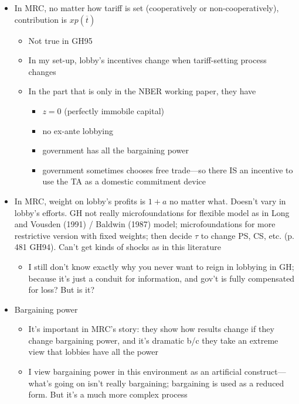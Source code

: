 \documentclass[12pt]{article}
\newcommand{\ov}{\overline}
\begin{document}
\begin{itemize}
	\item In MRC, no matter how tariff is set (cooperatively or non-cooperatively), contribution is $xp(\ov{t})$
		\begin{itemize}
			\item Not true in GH95
			\item In my set-up, lobby's incentives change when tariff-setting process changes
			\item In the part that is only in the NBER working paper, they have
				\begin{itemize}
					\item $z=0$ (perfectly immobile capital)
					\item no ex-ante lobbying
					\item government has all the bargaining power
					\item government sometimes chooses free trade---so there IS an incentive to use the TA as a domestic commitment device
				\end{itemize}
		\end{itemize}
	\item In MRC, weight on lobby's profits is $1+a$ no matter what. Doesn't vary in lobby's efforts. GH not really microfoundations for flexible model as in Long and Vousden (1991) / Baldwin (1987) model; microfoundations for more restrictive version with fixed weights; then decide $\tau$ to change PS, CS, etc. (p. 481 GH94). Can't get kinds of shocks as in this literature
		\begin{itemize}
			\item I still don't know exactly why you never want to reign in lobbying in GH; because it's just a conduit for information, and gov't is fully compensated for loss? But is it?
		\end{itemize}
	\item Bargaining power
		\begin{itemize}
			\item It's important in MRC's story: they show how results change if they change bargaining power, and it's dramatic b/c they take an extreme view that lobbies have all the power
			\item I view bargaining power in this environment as an artificial construct---what's going on isn't really bargaining; bargaining is used as a reduced form. But it's a much more complex process
		\end{itemize}
\end{itemize}

		
\end{document}
